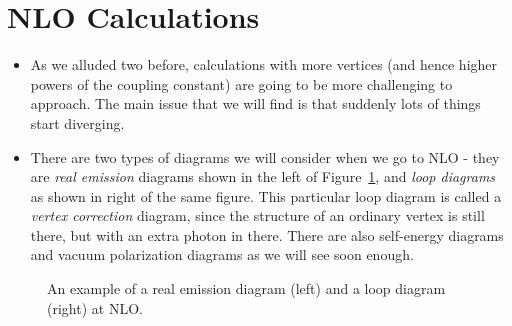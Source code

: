 \section{NLO Calculations}

\begin{itemize}
    \item As we alluded two before, calculations with more vertices (and hence higher powers of the coupling constant) are going to be more challenging to approach. The main issue that we will find is that suddenly lots of things start diverging.
    \item There are two types of diagrams we will consider when we go to NLO - they are \textit{real emission} diagrams shown in the left of Figure~\ref{fig:BaseNLODiagrams}, and \textit{loop diagrams} as shown in right of the same figure. This particular loop diagram is called a \textit{vertex correction} diagram, since the structure of an ordinary vertex is still there, but with an extra photon in there. There are also self-energy diagrams and vacuum polarization diagrams as we will see soon enough.
\end{itemize}

\begin{figure}[ht]
    \centering

    \hspace*{3cm}

    \caption{An example of a real emission diagram (left) and a loop diagram (right) at NLO.}
    \label{fig:BaseNLODiagrams}
\end{figure}



